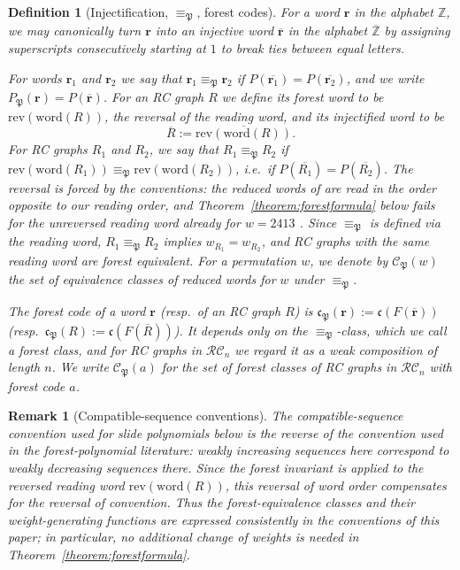\documentclass[pdflatex,sn-mathphys-num]{sn-jnl}
\numberwithin{equation}{subsection}
\newcommand{\wof}[1]{w_{#1}}
\newcommand{\RC}{\mathcal{RC}}
\newcommand{\code}{\mathfrak{c}}
\newcommand{\forest}{\mathfrak{P}}
\newcommand{\finv}{P_{\forest}}
\theoremstyle{thmstyleone}
\theoremstyle{thmstylethree}
\newtheorem{definition}[lemma]{Definition}
\theoremstyle{thmstyletwo}
\newtheorem*{remark}{Remark}
\begin{document}
\begin{definition}[Injectification, $\equiv_\forest$, forest codes]\label{definition:forestequiv}
  For a word $\mathbf{r}$ in the alphabet $\mathbb{Z}$, we may canonically turn $\mathbf{r}$ into an injective word $\overline{\mathbf r}$ in the alphabet $\overline{\mathbb{Z}}$ by assigning superscripts consecutively starting at $1$ to break ties between equal letters.

For words $\mathbf{r}_1$ and $\mathbf{r}_2$ we say that $\mathbf{r}_1\equiv_\forest\mathbf{r}_2$ if $P(\overline{\mathbf{r}_1}) = P(\overline{\mathbf{r}_2})$, and we write $\finv(\mathbf r)=P(\overline{\mathbf r})$. For an RC graph $R$ we define its \emph{forest word} to be $\mathrm{rev}(\mathrm{word}(R))$, the reversal of the reading word, and its \emph{injectified word} to be
$$\overline{R} := \overline{\mathrm{rev}(\mathrm{word}(R))}.$$
For RC graphs $R_1$ and $R_2$, we say that $R_1\equiv_\forest R_2$ if $\mathrm{rev}(\mathrm{word}(R_1))\equiv_\forest \mathrm{rev}(\mathrm{word}(R_2))$, i.e.\ if $P(\overline{R_1})=P(\overline{R_2})$. The reversal is forced by the conventions: the reduced words of \cite{nadeau2024forest} are read in the order opposite to our reading order, and Theorem~\ref{theorem:forestformula} below fails for the unreversed reading word already for $w=2413$ \cite[Definition~\ref*{B-definition:forestequiv}]{samuelbialgebra}. Since $\equiv_\forest$ is defined via the reading word, $R_1\equiv_\forest R_2$ implies $\wof{R_1}=\wof{R_2}$, and RC graphs with the same reading word are forest equivalent. For a permutation $w$, we denote by $\mathcal{C}_\forest(w)$ the set of equivalence classes of reduced words for $w$ under $\equiv_\forest$.

The \emph{forest code} of a word $\mathbf r$ (resp.\ of an RC graph $R$) is $\code_\forest(\mathbf r) := \code(F(\overline{\mathbf r}))$ (resp.\ $\code_\forest(R):=\code(F(\overline{R}))$). It depends only on the $\equiv_\forest$-class, which we call a \emph{forest class}, and for RC graphs in $\RC_n$ we regard it as a weak composition of length $n$. We write $\mathcal{C}_\forest(a)$ for the set of forest classes of RC graphs in $\RC_n$ with forest code $a$.
\end{definition}

\begin{remark}[Compatible-sequence conventions]
The compatible-sequence convention used for slide polynomials below is the reverse of the convention used in the forest-polynomial literature: weakly increasing sequences here correspond to weakly decreasing sequences there. Since the forest invariant is applied to the reversed reading word $\mathrm{rev}(\mathrm{word}(R))$, this reversal of word order compensates for the reversal of convention. Thus the forest-equivalence classes and their weight-generating functions are expressed consistently in the conventions of this paper; in particular, no additional change of weights is needed in Theorem~\ref{theorem:forestformula}.
\end{remark}
\end{document}
